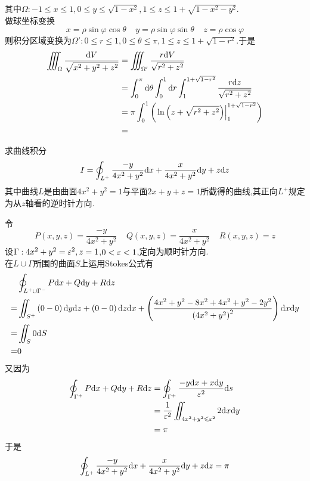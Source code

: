 \documentclass{ctexart}
\begin{document}
\begin{solution}
\begin{enumerate}[label=\tbf{(\arabic*)}]
            其中$\Omega:-1\leqslant x\leqslant 1,0\leqslant y\leqslant\sqrt{1-x^2},1\leqslant z\leqslant 1+\sqrt{1-x^2-y^2}$.\\
            做球坐标变换
            \[x=\rho\sin\varphi\cos\theta\ \ \ \ \ y=\rho\sin\varphi\sin\theta\ \ \ \ \ z=\rho\cos\varphi\]
            则积分区域变换为$\Omega':0\leqslant r\leqslant 1,0\leqslant\theta\leqslant\pi,1\leqslant z\leqslant1+\sqrt{1-r^2}$.于是
            \[\begin{aligned}
                \iiint_{\Omega}\dfrac{\mathrm{d} V}{\sqrt{x^2+y^2+z^2}}
                &= \iiint_{\Omega'}\dfrac{r\mathrm{d} V}{\sqrt{r^2+z^2}} \\
                &= \int_0^{\pi}\mathrm{d}\theta\int_0^1\mathrm{d} r\int_1^{1+\sqrt{1-r^2}}\dfrac{r\mathrm{d} z}{\sqrt{r^2+z^2}} \\
                &= \pi\int_0^1\left(\left.\ln\left(z+\sqrt{r^2+z^2}\right)\right|_1^{1+\sqrt{1-r^2}}\right) \\
                &= 
            \end{aligned}\]

    \end{enumerate}

\end{solution}
\begin{problem}[2.(20\songti{分})]
    求曲线积分
    \[I=\oint_{L^+}\dfrac{-y}{4x^2+y^2}\mathrm{d} x+\dfrac{x}{4x^2+y^2}\mathrm{d} y+z\mathrm{d} z\]
    其中曲线$L$是由曲面$4x^2+y^2=1$与平面$2x+y+z=1$所截得的曲线,其正向$L^+$规定为从$z$轴看的逆时针方向.
\end{problem}
\begin{solution}
    令
    \[P(x,y,z)=\dfrac{-y}{4x^2+y^2}\ \ \ \ \ Q(x,y,z)=\dfrac{x}{4x^2+y^2}\ \ \ \ \ R(x,y,z)=z\]
    设$\Gamma:4x^2+y^2=\varepsilon^2,z=1$,$0<\varepsilon<1$,定向为顺时针方向.\\
    在$L\cup\Gamma$所围的曲面$S$上运用Stokes公式有
    \[\begin{aligned}
        &\oint_{L^+\cup\Gamma^-}P\mathrm{d} x+Q\mathrm{d} y+R\mathrm{d} z\\
        =&\iint_{S^+}\left(0-0\right)\mathrm{d} y\mathrm{d} z+\left(0-0\right)\mathrm{d} z\mathrm{d} x+\left(\dfrac{4x^2+y^2-8x^2+4x^2+y^2-2y^2}{\left(4x^2+y^2\right)^2}\right)\mathrm{d} x\mathrm{d} y \\
        =&\iint_{S}0\mathrm{d} S \\
        =&0
    \end{aligned}\]
    又因为
    \[\begin{aligned}
        \oint_{\Gamma^+}P\mathrm{d} x+Q\mathrm{d} y+R\mathrm{d} z
        &= \oint_{\Gamma^+}\dfrac{-y\mathrm{d} x+x\mathrm{d} y}{\varepsilon^2}\mathrm{d} s \\
        &= \dfrac{1}{\varepsilon^2}\iint_{4x^2+y^2\leqslant\varepsilon^2}2\mathrm{d} x\mathrm{d} y \\
        &= \pi
    \end{aligned}\]
    于是
    \[\oint_{L^+}\dfrac{-y}{4x^2+y^2}\mathrm{d} x+\dfrac{x}{4x^2+y^2}\mathrm{d} y+z\mathrm{d} z=\pi\]

\end{solution}
\end{document}
